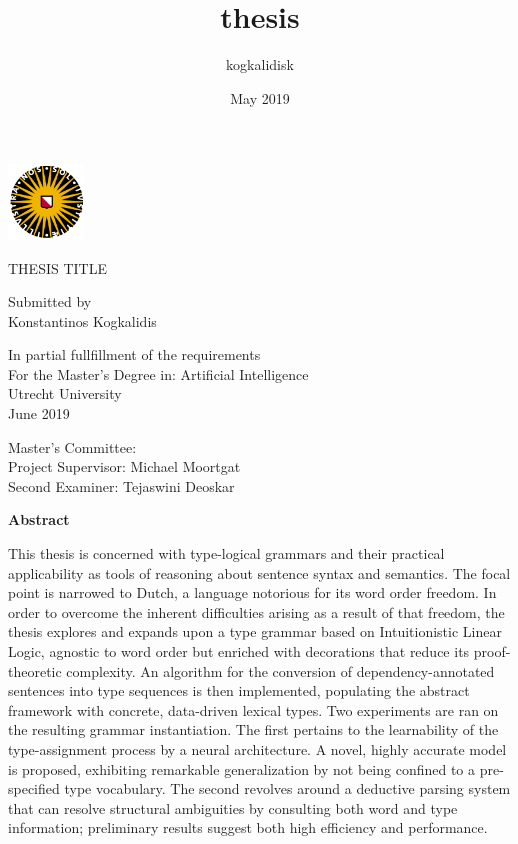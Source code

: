 \documentclass{book}
\title{thesis}
\author{kogkalidisk }
\date{May 2019}
\newlength{\arrow}
\newenvironment{abstract}%
    {\cleardoublepage\thispagestyle{empty}\null\vfill\begin{center}%
    \bfseries\abstractname\end{center}}%
    {\vfill\null}
\newcommand\abstractname{Abstract}
\begin{document}
\begin{titlepage}
	\centering
	\includegraphics[width=0.15\textwidth]{Figures/uu.png}\par\vspace{1cm}
	\vspace{1.5cm}
	{\huge THESIS TITLE\par}
	\vspace{2cm}
	{\Large Submitted by \\
	\vspace{1.6em}
	 Konstantinos Kogkalidis}
	 \vspace{2cm}
	 
	 {In partial fullfillment of the requirements\\
	 \vspace{1.6em}
	 For the Master's Degree in: Artificial Intelligence  \\
	 \vspace{1.6em}
	 Utrecht University \\
	 \vspace{1.6em}
	 June 2019
	 }
	\vfill
	\begin{flushleft}
	Master's Committee: \\
	\quad\quad	Project Supervisor: Michael Moortgat \\
	\quad\quad	Second Examiner: Tejaswini Deoskar
	\end{flushleft}

\end{titlepage}

\begin{abstract}
This thesis is concerned with type-logical grammars and their practical applicability as tools of reasoning about sentence syntax and semantics.
The focal point is narrowed to Dutch, a language notorious for its word order freedom.
In order to overcome the inherent difficulties arising as a result of that freedom, the thesis explores and expands upon a type grammar based on Intuitionistic Linear Logic, agnostic to word order but enriched with decorations that reduce its proof-theoretic complexity.
An algorithm for the conversion of dependency-annotated sentences into type sequences is then implemented, populating the abstract framework with concrete, data-driven lexical types.
Two experiments are ran on the resulting grammar instantiation.
The first pertains to the learnability of the type-assignment process by a neural architecture. 
A novel, highly accurate model is proposed, exhibiting remarkable generalization by not being confined to a pre-specified type vocabulary.
The second revolves around a deductive parsing system that can resolve structural ambiguities by consulting both word and type information; preliminary results suggest both high efficiency and performance.
\end{abstract}
\end{document}
